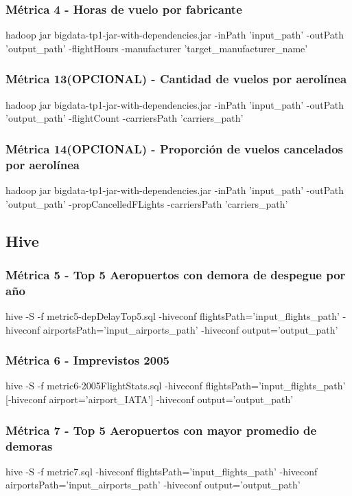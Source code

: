 \documentclass[a4paper,10pt]{article}
\begin{document}
        \subsubsection{Métrica 4 - Horas de vuelo por fabricante}
            \footnotesize{hadoop jar bigdata-tp1-jar-with-dependencies.jar -inPath 'input\_path' -outPath 'output\_path' -flightHours -manufacturer 'target\_manufacturer\_name'}
       \subsubsection{Métrica 13(OPCIONAL) - Cantidad de vuelos por aerolínea}
            \footnotesize{hadoop jar bigdata-tp1-jar-with-dependencies.jar -inPath 'input\_path' -outPath 'output\_path' -flightCount -carriersPath 'carriers\_path'}
        \subsubsection{Métrica 14(OPCIONAL) - Proporción de vuelos cancelados por aerolínea}
            \footnotesize{hadoop jar bigdata-tp1-jar-with-dependencies.jar -inPath 'input\_path' -outPath 'output\_path' -propCancelledFLights -carriersPath 'carriers\_path'}

    \subsection{Hive}
        \subsubsection{Métrica 5 - Top 5 Aeropuertos con demora de despegue por año}
        \footnotesize{hive -S -f metric5-depDelayTop5.sql -hiveconf flightsPath='input\_flights\_path' -hiveconf airportsPath='input\_airports\_path' -hiveconf output='output\_path'}
        \subsubsection{Métrica 6 - Imprevistos 2005}
        \footnotesize{hive -S -f metric6-2005FlightStats.sql -hiveconf flightsPath='input\_flights\_path' [-hiveconf airport='airport\_IATA'] -hiveconf output='output\_path'}
        \subsubsection{Métrica 7 - Top 5 Aeropuertos con mayor promedio de demoras}
        \footnotesize{hive -S -f metric7.sql -hiveconf flightsPath='input\_flights\_path' -hiveconf airportsPath='input\_airports\_path' -hiveconf output='output\_path'}
\end{document}
